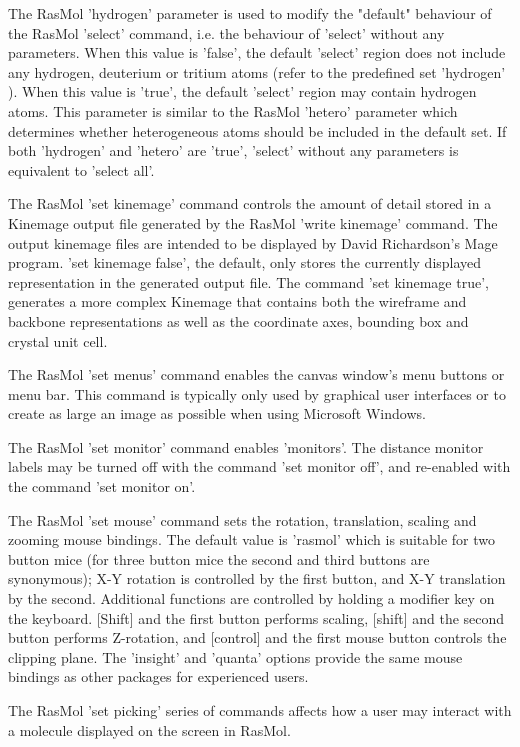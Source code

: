 The RasMol
'hydrogen'
parameter is used to modify the "default" behaviour of the RasMol
'select'
command, i.e. the behaviour of
'select'
without any parameters. When this value is
'false',
the default
'select'
region does not include any hydrogen, deuterium or tritium atoms (refer
to the predefined set
'hydrogen'
). When this value is
'true',
the default
'select'
region may contain hydrogen atoms. This parameter is similar to
the RasMol
'hetero'
parameter which determines whether heterogeneous atoms should be
included in the default set. If both
'hydrogen'
and
'hetero'
are
'true',
'select'
without any parameters is equivalent to
'select all'.

The RasMol
'set kinemage'
command controls the amount of detail stored in a Kinemage output
file generated by the RasMol
'write kinemage'
command. The output kinemage files are intended to be displayed by
David Richardson's Mage program.
'set kinemage false',
the default, only stores the currently displayed representation in
the generated output file. The command
'set kinemage true',
generates a more complex Kinemage that contains both the wireframe
and backbone representations as well as the coordinate axes,
bounding box and crystal unit cell.

The RasMol
'set menus'
command enables the canvas window's menu buttons or menu bar. This
command is typically only used by graphical user interfaces or to
create as large an image as possible when using Microsoft Windows.

The RasMol
'set monitor'
command enables
'monitors'.
The distance monitor labels may be turned off with the command
'set monitor off',
and re-enabled with the command
'set monitor on'.


The RasMol
'set mouse'
command sets the rotation, translation, scaling and zooming mouse
bindings. The default value is
'rasmol'
which is suitable for two button mice (for three button mice the
second and third buttons are synonymous); X-Y rotation is controlled
by the first button, and X-Y translation by the second. Additional
functions are controlled by holding a modifier key on the keyboard.
[Shift] and the first button performs scaling, [shift] and the second
button performs Z-rotation, and [control] and the first mouse button
controls the clipping plane. The
'insight'
and
'quanta'
options provide the same mouse bindings as other packages for experienced
users.

The RasMol
'set picking'
series of commands affects how a user may interact with a
molecule displayed on the screen in RasMol.

